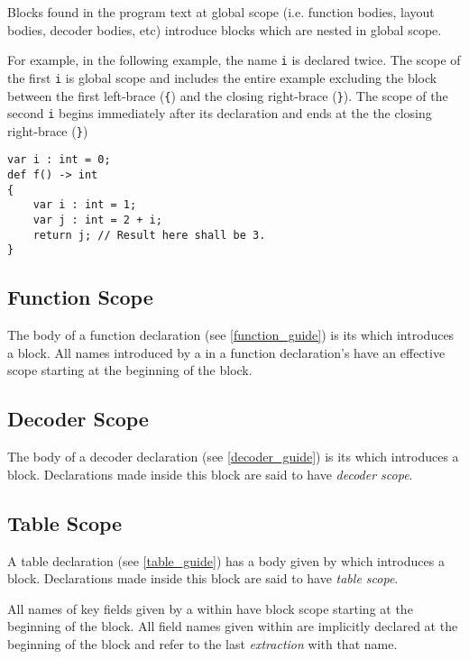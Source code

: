 Blocks found in the program text at global scope (i.e. function bodies, layout bodies, decoder bodies, etc) introduce blocks which are nested in global scope.

For example, in the following example, the name \texttt{i} is declared twice. The scope of the first \texttt{i} is global scope and includes the entire example excluding the block between the first left-brace (\texttt{\{}) and the closing right-brace (\texttt{\}}). The scope of the second \texttt{i} begins immediately after its declaration and ends at the the closing right-brace (\texttt{\}})

\noindent\begin{minipage}{\linewidth}
\begin{lstlisting}
var i : int = 0;
def f() -> int
{
	var i : int = 1;
	var j : int = 2 + i;
	return j; // Result here shall be 3.
}
\end{lstlisting}
\end{minipage}

\subsection{Function Scope} \label{function_scope}

The body of a function declaration (see \ref{function_guide}) is its  which introduces a block. All names introduced by a  in a function declaration's  have an effective scope starting at the beginning of the block.

\subsection{Decoder Scope} \label{decoder_scope}

The body of a decoder declaration (see \ref{decoder_guide}) is its  which introduces a block. Declarations made inside this block are said to have \textit{decoder scope}.

\subsection{Table Scope} \label{table_scope}

A table declaration (see \ref{table_guide}) has a body given by  which introduces a block. Declarations made inside this block are said to have \textit{table scope}.

All names of key fields given by a  within  have block scope starting at the beginning of the block. All field names given within  are implicitly declared at the beginning of the block and refer to the last \textit{extraction} with that name.

